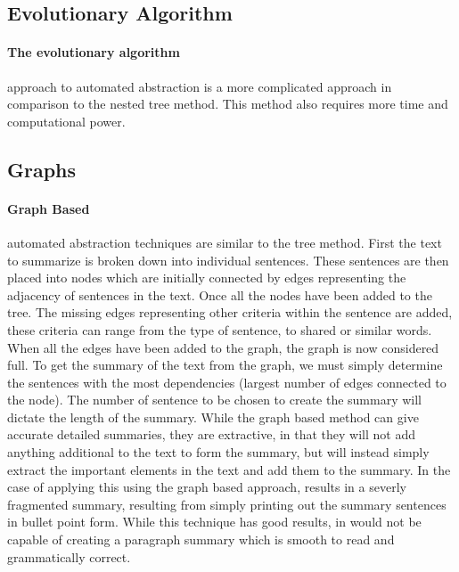 \subsection{ Evolutionary Algorithm}

	\paragraph{The evolutionary algorithm} approach to automated abstraction is a more complicated approach in comparison to the nested tree method. This method also requires more time and computational power.


\subsection{Graphs}

	\paragraph{Graph Based} automated abstraction techniques are similar to the tree method. First the text to summarize is broken down into individual sentences. These sentences are then placed into nodes which are initially connected by edges representing the adjacency of sentences in the text. Once all the nodes have been added to the tree. The missing edges representing other criteria within the sentence are added, these criteria can range from the type of sentence, to shared or similar words. When all the edges have been added to the graph, the graph is now considered full. To get the summary of the text from the graph, we must simply determine the sentences with the most dependencies (largest number of edges connected to the node). The number of sentence to be chosen to create the summary will dictate the length of the summary. While the graph based method can give accurate detailed summaries, they are extractive, in that they will not add anything additional to the text to form the summary, but will instead simply extract the important elements in the text and add them to the summary. In the case of applying this using the graph based approach, results in a severly fragmented summary, resulting from simply printing out the summary sentences in bullet point form. While this technique has good results, in would not be capable of creating a paragraph summary which is smooth to read and grammatically correct.
